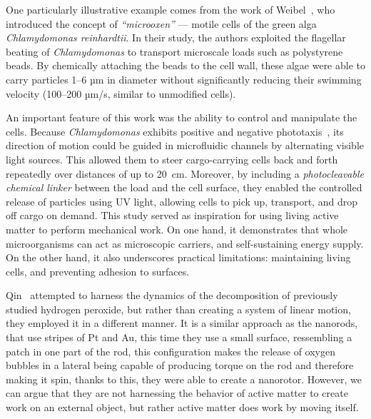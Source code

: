 One particularly illustrative example comes from the work of Weibel~\cite{weibel2005microoxen}, who introduced the concept of \textit{``microoxen''} --- motile cells of the green alga \textit{Chlamydomonas reinhardtii}. In their study, the authors exploited the flagellar beating of \textit{Chlamydomonas} to transport microscale loads such as polystyrene beads. By chemically attaching the beads to the cell wall, these algae were able to carry particles 1--6 µm in diameter without significantly reducing their swimming velocity (100–200 µm/s, similar to unmodified cells). 

An important feature of this work was the ability to control and manipulate the cells. Because \textit{Chlamydomonas} exhibits positive and negative phototaxis~\cite{bennett2015steering}, its direction of motion could be guided in microfluidic channels by alternating visible light sources. This allowed them to steer cargo-carrying cells back and forth repeatedly over distances of up to 20~cm. Moreover, by including a \textit{photocleavable chemical linker} between the load and the cell surface, they enabled the controlled release of particles using UV light, allowing cells to pick up, transport, and drop off cargo on demand.
This study served as inspiration for using living active matter to perform mechanical work. On one hand, it demonstrates that whole microorganisms can act as microscopic carriers, and self-sustaining energy supply. On the other hand, it also underscores practical limitations: maintaining living cells, and preventing adhesion to surfaces.

 Qin~\cite{qin2007rational} attempted to harness the dynamics of the decomposition of previously studied hydrogen peroxide, but rather than creating a system of linear motion, they employed it in a different manner. It is a similar approach as the nanorods, that use stripes of Pt and Au, this time they use a small surface, ressembling a patch in one part of the rod, this configuration makes the release of oxygen bubbles in a lateral being capable of producing torque on the rod and therefore making it spin, thanks to this, they were able to create a nanorotor. However, we can argue that they are not harnessing the behavior of active matter to create work on an external object, but rather active matter does work by moving itself. 

